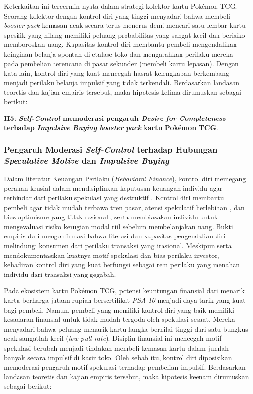 \documentclass[12pt,a4paper]{article}
\numberwithin{equation}{section}
\numberwithin{table}{section}
\numberwithin{figure}{section}
\begin{document}
Keterkaitan ini tercermin nyata dalam strategi kolektor kartu Pok\'emon TCG. Seorang kolektor dengan kontrol diri yang tinggi menyadari bahwa membeli \emph{booster pack} kemasan acak secara terus-menerus demi mencari satu lembar kartu spesifik yang hilang memiliki peluang probabilitas yang sangat kecil dan berisiko memboroskan uang. Kapasitas kontrol diri membantu pembeli mengendalikan keinginan belanja spontan di etalase toko dan mengarahkan perilaku mereka pada pembelian terencana di pasar sekunder (membeli kartu lepasan). Dengan kata lain, kontrol diri yang kuat mencegah hasrat kelengkapan berkembang menjadi perilaku belanja impulsif yang tidak terkendali. Berdasarkan landasan teoretis dan kajian empiris tersebut, maka hipotesis kelima dirumuskan sebagai berikut:

\vspace{0.2cm}
\textbf{H5: \emph{Self-Control} memoderasi pengaruh \emph{Desire for Completeness} terhadap \emph{Impulsive Buying} \emph{booster pack} kartu Pok\'emon TCG.}

\subsubsection{Pengaruh Moderasi \emph{Self-Control} terhadap Hubungan \emph{Speculative Motive} dan \emph{Impulsive Buying}}

Dalam literatur Keuangan Perilaku (\emph{Behavioral Finance}), kontrol diri memegang peranan krusial dalam mendisiplinkan keputusan keuangan individu agar terhindar dari perilaku spekulasi yang destruktif \citep{baumeister2024selfcontrol}. Kontrol diri membantu pembeli agar tidak mudah terbawa tren pasar, atensi spekulatif berlebihan \citep{alfina2023fomo}, dan bias optimisme yang tidak rasional \citep{gachter2022individual}, serta membiasakan individu untuk mengevaluasi risiko kerugian modal riil sebelum membelanjakan uang. Bukti empiris dari \citet{katauke2023financial} mengonfirmasi bahwa literasi dan kapasitas pengendalian diri melindungi konsumen dari perilaku transaksi yang irasional. Meskipun \citet{aryadi2024personal} serta \citet{colline2024biases} mendokumentasikan kuatnya motif spekulasi dan bias perilaku investor, kehadiran kontrol diri yang kuat berfungsi sebagai rem perilaku yang menahan individu dari transaksi yang gegabah.

Pada ekosistem kartu Pok\'emon TCG, potensi keuntungan finansial dari menarik kartu berharga jutaan rupiah bersertifikat \emph{PSA 10} menjadi daya tarik yang kuat bagi pembeli. Namun, pembeli yang memiliki kontrol diri yang baik memiliki kesadaran finansial untuk tidak mudah tergoda oleh spekulasi sesaat. Mereka menyadari bahwa peluang menarik kartu langka bernilai tinggi dari satu bungkus acak sangatlah kecil (\emph{low pull rate}). Disiplin finansial ini mencegah motif spekulasi berubah menjadi tindakan membeli kemasan kartu dalam jumlah banyak secara impulsif di kasir toko. Oleh sebab itu, kontrol diri diposisikan memoderasi pengaruh motif spekulasi terhadap pembelian impulsif. Berdasarkan landasan teoretis dan kajian empiris tersebut, maka hipotesis keenam dirumuskan sebagai berikut:
\end{document}
